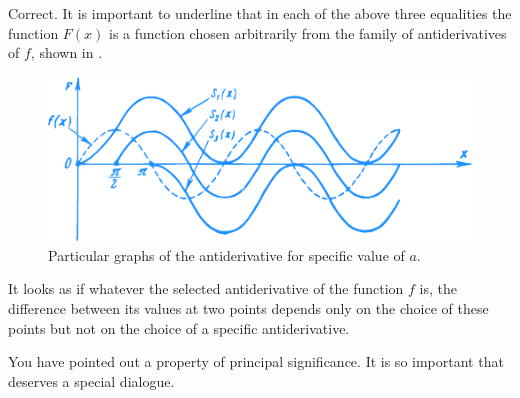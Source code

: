 \athr  Correct. It is important to underline that in each of the above three equalities the function $F (x)$ is a function chosen arbitrarily from the family of antiderivatives of $f$, shown in .

\begin{figure}[!ht]%
\centering
\includegraphics[width=\textwidth]{figures/fig-48.pdf}
\caption{Particular graphs of the antiderivative for specific value of $a$.}
\label{fig-48}
\end{figure}

\rdr It looks as if whatever the selected antiderivative of the function $f$ is, the difference between its values at two points depends only on the choice of these points but not on the choice of a specific antiderivative.

\athr You have pointed out a property of principal significance. It is so important that deserves a special dialogue.